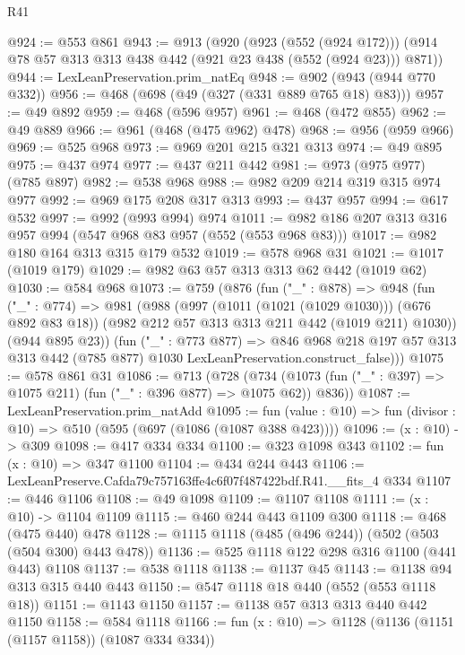 \begin{lexlean}{R41}
\begin{coremodule}
@924 := @553 @861
@943 := @913
    (@920
      (@923 (@552 (@924 @172)))
      (@914 @78 @57 @313 @313 @438 @442 (@921 @23 @438 (@552 (@924 @23))) @871))
@944 := LexLeanPreservation.prim_natEq
@948 := @902 (@943 (@944 @770 @332))
@956 := @468 (@698 (@49 (@327 (@331 @889 @765 @18) @83)))
@957 := @49 @892
@959 := @468 (@596 @957)
@961 := @468 (@472 @855)
@962 := @49 @889
@966 := @961 (@468 (@475 @962) @478)
@968 := @956 (@959 @966)
@969 := @525 @968
@973 := @969 @201 @215 @321 @313
@974 := @49 @895
@975 := @437 @974
@977 := @437 @211 @442
@981 := @973 (@975 @977) (@785 @897)
@982 := @538 @968
@988 := @982 @209 @214 @319 @315 @974 @977
@992 := @969 @175 @208 @317 @313
@993 := @437 @957
@994 := @617 @532
@997 := @992 (@993 @994) @974
@1011 := @982 @186 @207 @313 @316 @957 @994 (@547 @968 @83 @957 (@552 (@553 @968 @83)))
@1017 := @982 @180 @164 @313 @315 @179 @532
@1019 := @578 @968 @31
@1021 := @1017 (@1019 @179)
@1029 := @982 @63 @57 @313 @313 @62 @442 (@1019 @62)
@1030 := @584 @968
@1073 := @759
    (@876
      (fun ("_" : @878) =>
      @948
        (fun ("_" : @774) =>
        @981
          (@988
            (@997 (@1011 (@1021 (@1029 @1030))) (@676 @892 @83 @18))
            (@982 @212 @57 @313 @313 @211 @442 (@1019 @211) @1030))
          (@944 @895 @23))
        (fun ("_" : @773 @877) =>
        @846
          @968
          @218
          @197
          @57
          @313
          @313
          @442
          (@785 @877)
          @1030
          LexLeanPreservation.construct_false)))
@1075 := @578 @861 @31
@1086 := @713
    (@728 (@734 (@1073 (fun ("_" : @397) => @1075 @211) (fun ("_" : @396 @877) => @1075 @62)) @836))
@1087 := LexLeanPreservation.prim_natAdd
@1095 := fun (value : @10) => fun (divisor : @10) => @510 (@595 (@697 (@1086 (@1087 @388 @423))))
@1096 := (x : @10) -> @309
@1098 := @417 @334 @334
@1100 := @323 @1098 @343
@1102 := fun (x : @10) => @347 @1100
@1104 := @434 @244 @443
@1106 := LexLeanPreserve.Cafda79c757163ffe4c6f07f487422bdf.R41.__fits_4 @334
@1107 := @446 @1106
@1108 := @49 @1098
@1109 := @1107 @1108
@1111 := (x : @10) -> @1104 @1109
@1115 := @460 @244 @443 @1109 @300
@1118 := @468 (@475 @440) @478
@1128 := @1115 @1118 (@485 (@496 @244)) (@502 (@503 (@504 @300) @443 @478))
@1136 := @525 @1118 @122 @298 @316 @1100 (@441 @443) @1108
@1137 := @538 @1118
@1138 := @1137 @45
@1143 := @1138 @94 @313 @315 @440 @443
@1150 := @547 @1118 @18 @440 (@552 (@553 @1118 @18))
@1151 := @1143 @1150
@1157 := @1138 @57 @313 @313 @440 @442 @1150
@1158 := @584 @1118
@1166 := fun (x : @10) => @1128 (@1136 (@1151 (@1157 @1158)) (@1087 @334 @334))

\end{coremodule}
\end{lexlean}
